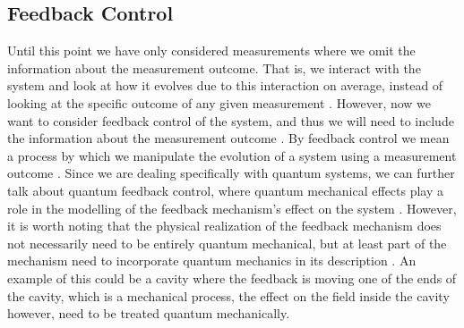 \subsection{Feedback Control} \label{sec:feedback}
Until this point we have only considered measurements where we omit the information about the measurement outcome. That is, we interact with the system and look at how it evolves due to this interaction on average, instead of looking at the specific outcome of any given measurement \cite{Annby-Andersson:2024}. However, now we want to consider feedback control of the system, and thus we will need to include the information about the measurement outcome \cite{Annby-Andersson:2024}. By feedback control we mean a process by which we manipulate the evolution of a system using a measurement outcome \cite{Wiseman:2009}. Since we are dealing specifically with quantum systems, we can further talk about quantum feedback control, where quantum mechanical effects play a role in the modelling of the feedback mechanism's effect on the system \cite{Wiseman:2009}. However, it is worth noting that the physical realization of the feedback mechanism does not necessarily need to be entirely quantum mechanical, but at least part of the mechanism need to incorporate quantum mechanics in its description \cite{Wiseman:2009}. An example of this could be a cavity where the feedback is moving one of the ends of the cavity, which is a mechanical process, the effect on the field inside the cavity however, need to be treated quantum mechanically.

